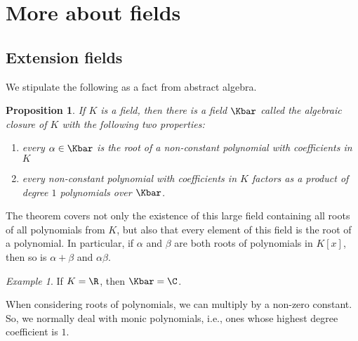 \documentclass[12pt]{amsart}
\newcommand{\terminology}[1]{\textbf{\textit{#1}}}
\renewcommand{\terminology}[1]{#1}
\newcommand{\term}{\terminology}
\theoremstyle{plain}
\newtheorem{prop}[thm]{Proposition}
\theoremstyle{definition}
\theoremstyle{remark}
\newtheorem*{exam}{Example}
\begin{document}
\section{More about fields}
\subsection{Extension fields}

We stipulate the following as a fact from abstract algebra.
\begin{prop}
  If $K$ is a field, then there is a field $\Kbar$ called the {\em
    algebraic closure of $K$} with the following two properties:
  \begin{enumerate}
  \item every $\alpha\in \Kbar$ is the root of a non-constant polynomial with
    coefficients in $K$
  \item every non-constant polynomial with coefficients in $K$ factors
    as a product of degree $1$ polynomials over $\Kbar$.
  \end{enumerate}
\end{prop}
The theorem covers not only the existence of this large field
containing all roots of all polynomials from $K$, but also that every
element of this field is the root of a polynomial.  In particular, if
$\alpha$ and $\beta$ are both roots of polynomials in $K[x]$, then so
is $\alpha+\beta$ and $\alpha\beta$.


\begin{exam}
  If $K=\R$, then $\Kbar=\C$.
\end{exam}

When considering roots of polynomials, we can multiply by a non-zero
constant.  So, we normally deal with \term{monic} polynomials, i.e.,
ones whose highest degree coefficient is $1$.
\end{document}
